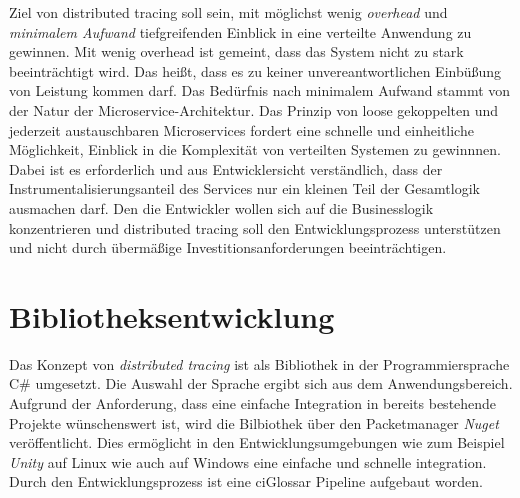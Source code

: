 Ziel von distributed tracing soll sein, mit möglichst wenig \emph{overhead} und \emph{minimalem Aufwand} tiefgreifenden Einblick in eine verteilte Anwendung zu gewinnen. Mit wenig overhead ist gemeint, dass das System nicht zu stark beeinträchtigt wird. Das heißt, dass es zu keiner unvereantwortlichen Einbüßung von Leistung kommen darf. Das Bedürfnis nach minimalem Aufwand stammt von der Natur der Microservice-Architektur. Das Prinzip von loose gekoppelten und jederzeit austauschbaren Microservices fordert eine schnelle und einheitliche  Möglichkeit, Einblick in die Komplexität von verteilten Systemen zu gewinnnen. Dabei ist es erforderlich und aus Entwicklersicht verständlich, dass der Instrumentalisierungsanteil des Services nur ein kleinen Teil der Gesamtlogik ausmachen darf. Den die Entwickler wollen sich auf die Businesslogik konzentrieren und distributed tracing soll den Entwicklungsprozess unterstützen und nicht durch übermäßige Investitionsanforderungen beeinträchtigen.

 
\section{Bibliotheksentwicklung}
\label{subsection:Bibliotheksentwicklung}

Das Konzept von \emph{distributed tracing} ist als Bibliothek in der Programmiersprache C\# umgesetzt. Die Auswahl der Sprache ergibt sich aus dem Anwendungsbereich. Aufgrund der Anforderung, dass eine einfache Integration in bereits bestehende Projekte wünschenswert ist, wird die Bilbiothek über den Packetmanager \emph{Nuget} veröffentlicht. Dies ermöglicht in den Entwicklungsumgebungen wie zum Beispiel \emph{Unity} auf Linux wie auch auf Windows eine einfache und schnelle integration. Durch den Entwicklungsprozess ist eine \gls{ciGlossar} Pipeline aufgebaut worden. 

